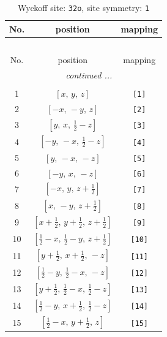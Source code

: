 \documentclass[fleqn,8pt]{jsarticle}
\begin{document}
\renewcommand{\arraystretch}{1.2}
\begin{longtable}{ccc}
\caption{Wyckoff site: {\tt 32o}, site symmetry: {\tt 1}}
 \\
 \hline \hline
No. & position & mapping \\ \hline \endfirsthead

\multicolumn{2}{l}{\tablename\ \thetable{}} \\
 \hline \hline
No. & position & mapping \\ \hline \endhead

 \hline \hline
\multicolumn{2}{r}{\footnotesize\it continued ...} \\ \endfoot

 \hline \hline
\multicolumn{2}{r}{} \\ \endlastfoot

1 & $\left[ x,\, y,\, z \right]$ & {\tt [1]} \\ \hline
2 & $\left[ - x,\, - y,\, z \right]$ & {\tt [2]} \\ \hline
3 & $\left[ y,\, x,\, \frac{1}{2} - z \right]$ & {\tt [3]} \\ \hline
4 & $\left[ - y,\, - x,\, \frac{1}{2} - z \right]$ & {\tt [4]} \\ \hline
5 & $\left[ y,\, - x,\, - z \right]$ & {\tt [5]} \\ \hline
6 & $\left[ - y,\, x,\, - z \right]$ & {\tt [6]} \\ \hline
7 & $\left[ - x,\, y,\, z + \frac{1}{2} \right]$ & {\tt [7]} \\ \hline
8 & $\left[ x,\, - y,\, z + \frac{1}{2} \right]$ & {\tt [8]} \\ \hline
9 & $\left[ x + \frac{1}{2},\, y + \frac{1}{2},\, z + \frac{1}{2} \right]$ & {\tt [9]} \\ \hline
10 & $\left[ \frac{1}{2} - x,\, \frac{1}{2} - y,\, z + \frac{1}{2} \right]$ & {\tt [10]} \\ \hline
11 & $\left[ y + \frac{1}{2},\, x + \frac{1}{2},\, - z \right]$ & {\tt [11]} \\ \hline
12 & $\left[ \frac{1}{2} - y,\, \frac{1}{2} - x,\, - z \right]$ & {\tt [12]} \\ \hline
13 & $\left[ y + \frac{1}{2},\, \frac{1}{2} - x,\, \frac{1}{2} - z \right]$ & {\tt [13]} \\ \hline
14 & $\left[ \frac{1}{2} - y,\, x + \frac{1}{2},\, \frac{1}{2} - z \right]$ & {\tt [14]} \\ \hline
15 & $\left[ \frac{1}{2} - x,\, y + \frac{1}{2},\, z \right]$ & {\tt [15]} \\ \hline

\end{longtable}
\end{document}
